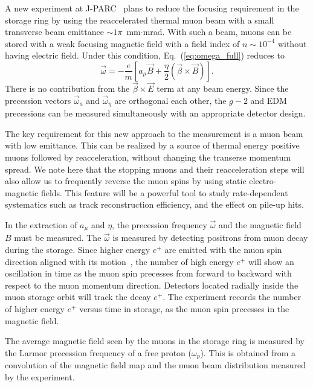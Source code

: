 A new experiment at J-PARC~\cite{TDRsummarypaper} plans to reduce the focusing requirement 
in the storage ring by using the reaccelerated thermal muon beam with a small transverse beam 
emittance $\sim1\pi$~mm$\cdot$mrad.
With such a beam, muons can be stored with a weak focusing magnetic field 
with a field index of $n \sim 10^{-4}$ without having electric field.
Under this condition, Eq.~(\ref{eq:omega_full}) reduces to
\begin{equation}
\vec{\omega}  =  
  - \frac{e}{m}\left[a_{\mu} \vec{B} 
  +\frac{\eta}{2} 
   \left(\vec{\beta} \times \vec{B} \right) 
   \right].
\label{eq:omega_tot}
\end{equation}
There is no contribution from the $\vec{\beta} \times \vec{E}$ term at any beam energy.
Since the precession vectors $\vec{\omega}_{a}$ and $\vec{\omega}_{\eta}$ 
are orthogonal each other, the $g-2$ and EDM precessions 
can be measured simultaneously with
an appropriate detector design.

The key requirement for this new approach to the measurement is a muon beam with low emittance.
This can be realized by a source of 
thermal energy positive muons followed by
reacceleration, without changing the transerse momentum spread. 
We note here that the stopping muons and their reacceleration steps will also
allow us to frequently reverse the muon spins by using static electro-magnetic fields.
This feature will be a powerful tool to study
rate-dependent systematics such as track reconstruction efficiency, and the effect on pile-up hits.

In the extraction of $a_{\mu}$ and $\eta$, 
the precession frequency $\vec{\omega}$ and the magnetic field $B$ must
be measured. The $\vec{\omega}$ is measured by detecting positrons from muon decay during the storage.
Since higher energy $e^+$ are emitted with the muon spin direction 
aligned with its motion~\cite{Konopinski:1959qr}, the number of high energy $e^+$ will show 
an oscillation in time as the muon spin precesses from forward to backward 
with respect to the muon momentum direction.
Detectors located radially inside the muon storage orbit will track the decay
$e^{+}$. The experiment records the number of higher energy $e^{+}$ 
versus time in storage, as the muon spin precesses in the magnetic field.

The average magnetic field seen by the muons in the storage ring 
is measured by the Larmor precession frequency of a free proton ($\omega_p$).
This is obtained from a convolution of the magnetic field map
and the muon beam distribution measured by the experiment.

